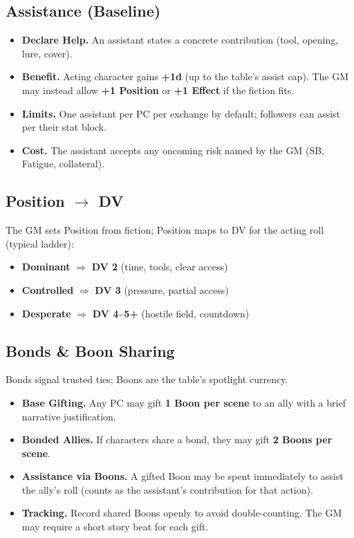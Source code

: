 \subsection{Assistance (Baseline)}
\label{sec:assistance}
\begin{itemize}
  \item \textbf{Declare Help.} An assistant states a concrete contribution (tool, opening, lure, cover).
  \item \textbf{Benefit.} Acting character gains \textbf{+1d} (up to the table's assist cap). The GM may instead allow \textbf{+1 Position} or \textbf{+1 Effect} if the fiction fits.
  \item \textbf{Limits.} One assistant per PC per exchange by default; followers can assist per their stat block.
  \item \textbf{Cost.} The assistant accepts any oncoming risk named by the GM (SB, Fatigue, collateral).
\end{itemize}

\subsection{Position $\to$ DV}
\label{sec:position-to-dv}
The GM sets Position from fiction; Position maps to DV for the acting roll (typical ladder):
\begin{itemize}
  \item \textbf{Dominant} $\Rightarrow$ \textbf{DV 2} (time, tools, clear access)
  \item \textbf{Controlled} $\Rightarrow$ \textbf{DV 3} (pressure, partial access)
  \item \textbf{Desperate} $\Rightarrow$ \textbf{DV 4--5+} (hostile field, countdown)
\end{itemize}

\subsection{Bonds \& Boon Sharing}
\label{sec:bonds-boons-summary}
Bonds signal trusted ties; Boons are the table's spotlight currency.
\begin{itemize}
  \item \textbf{Base Gifting.} Any PC may gift \textbf{1 Boon per scene} to an ally with a brief narrative justification.
  \item \textbf{Bonded Allies.} If characters share a bond, they may gift \textbf{2 Boons per scene}.
  \item \textbf{Assistance via Boons.} A gifted Boon may be spent immediately to assist the ally's roll (counts as the assistant's contribution for that action).
  \item \textbf{Tracking.} Record shared Boons openly to avoid double-counting. The GM may require a short story beat for each gift.
\end{itemize}

